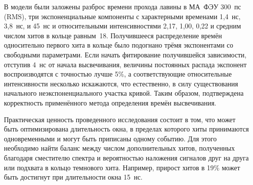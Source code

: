 В модели были заложены разброс времени прохода лавины в МА~ФЭУ 300~пс (RMS), три экспоненциальные компоненты с характерными временами 1,4~нс, 3,8~нс, и 45~нс и относительными интенсивностями 2,17, 1,00, 0,22 и средним числом хитов в кольце равным~18. Получившееся распределение времён односительно первого хита в кольце было подогнано трёмя экспонентами со свободными параметрами. Если начать фитирование получившейся зависимости, отступив 4~нс от начала высвечивания, величины постоянных распада экспонент воспроизводятся с точностью лучше 5\%, а соответствующие относительные интенсивности несколько искажаются, что естественно, в силу существования начального неэкспоненциального участка кривой. Таким образом, подтверждена корректность применённого метода определения времён высвечивания.

Практическая ценность проведенного исследования состоит в том, что может быть оптимизирована длительность окна, в пределах которого хиты принимаются одновременными и могут быть приписаны одному событию. Для этого необходимо найти баланс между числом дополнительных хитов, полученных благодаря сместителю спектра и вероятностью наложения сигналов друг на друга или подхвата в кольцо темнового хита. Например, прирост хитов в 19\% может быть достигнут при длительности окна 15~нс.

